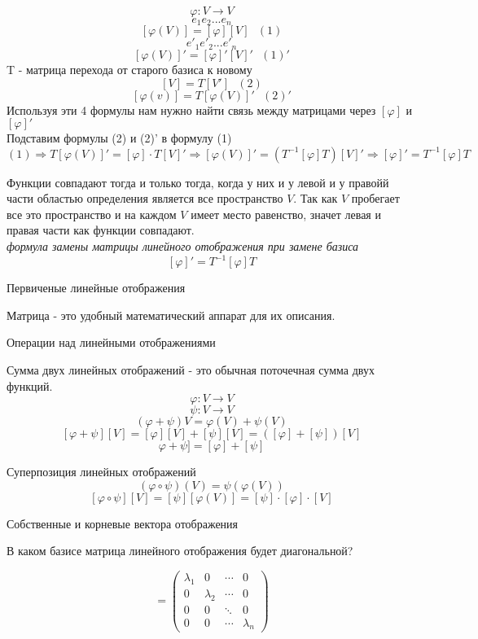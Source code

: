 \[\varphi: V \to V\]
\[e_1 e_2 ... e_n\]
\[[\varphi(V)] = [\varphi][V] ~~~ (1)\]
\[e'_1 e'_2 ... e'_n\]
\[[\varphi(V)]' = [\varphi]'[V]' ~~~ (1)'\]
T - матрица перехода от старого базиса к новому
\[[V] = T[V'] ~~~ (2)\]
\[[\varphi(v)] = T[\varphi (V)]' ~~~ (2)'\]
Используя эти 4 формулы нам нужно найти связь между матрицами через $[\varphi]$
и $[\varphi]'$\\
Подставим формулы (2) и (2)' в формулу (1)\\
\[(1) \Rightarrow T[\varphi(V)]' = [\varphi] \cdot T[V]' \Rightarrow
[\varphi(V)]' = \left(T^{-1} [\varphi] T \right)[V]' \Rightarrow [\varphi]' =
T^{-1}[\varphi]T\]

Функции совпадают тогда и только тогда, когда у них и у левой и у правойй части
областью определения является все пространство $V$. Так как $V$ пробегает все
это пространство и на каждом $V$ имеет место равенство, значет левая и правая
части как функции совпадают.\\

\emph{формула замены матрицы линейного отображения при замене базиса}
\[[\varphi]' = T^{-1} [\varphi]T\]

\begin{title}
{Первиченые линейные отображения}
\end{title}
Матрица - это удобный математический аппарат для их описания.\\

\begin{title}
{Операции над линейными отображениями}
\end{title}
Сумма двух линейных отображений - это обычная поточечная сумма двух функций.\\
\[\varphi: V \to V\]
\[\psi: V \to V\]
\[(\varphi + \psi)V = \varphi(V) + \psi(V)\]
\[[\varphi + \psi][V] = [\varphi][V] + [\psi][V] = ([\varphi] + [\psi])[V]\]
\[\varphi + \psi] = [\varphi] + [\psi]\]

Суперпозиция линейных отображений\\
\[(\varphi \circ \psi)(V) = \psi(\varphi(V))\]
\[[\varphi \circ \psi][V] = [\psi][\varphi(V)] = [\psi] \cdot [\varphi] \cdot [V]\]

\begin{title}
{Собственные и корневые вектора отображения}
\end{title}
В каком базисе матрица линейного отображения будет диагональной?

\begin{displaymath}
[\varphi] = \left(\begin{array}{lccr}
\lambda_1 & 0 & \cdots & 0\\
0 & \lambda_2 & \cdots & 0\\
0 & 0 & \ddots & 0\\
0 & 0 & \cdots & \lambda_n
\end{array}\right)
\end{displaymath}

